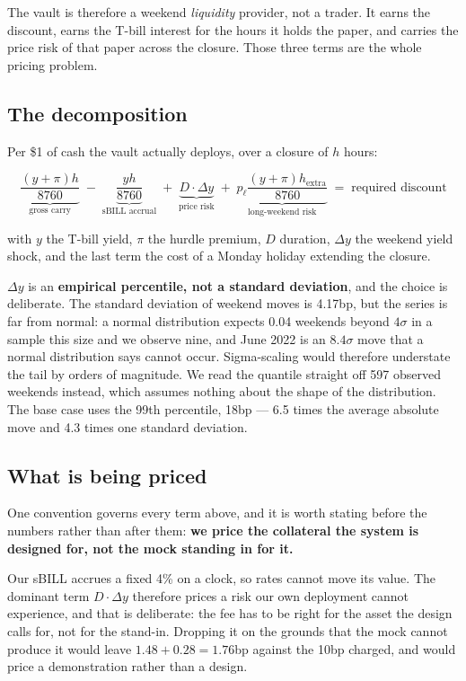 \documentclass[11pt,a4paper]{article}
\begin{document}
The vault is therefore a weekend \emph{liquidity} provider, not a trader. It earns the
discount, earns the T-bill interest for the hours it holds the paper, and carries the
price risk of that paper across the closure. Those three terms are the whole pricing
problem.

\subsection{The decomposition}

Per \$1 of cash the vault actually deploys, over a closure of $h$ hours:

\[
\underbrace{\frac{(y+\pi)h}{8760}}_{\text{gross carry}}
\;-\;\underbrace{\frac{yh}{8760}}_{\text{sBILL accrual}}
\;+\;\underbrace{D\cdot\Delta y}_{\text{price risk}}
\;+\;\underbrace{p_{\ell}\frac{(y+\pi)h_{\text{extra}}}{8760}}_{\text{long-weekend risk}}
\;=\;\text{required discount}
\]

with $y$ the T-bill yield, $\pi$ the hurdle premium, $D$ duration, $\Delta y$ the weekend
yield shock, and the last term the cost of a Monday holiday extending the closure.

$\Delta y$ is an \textbf{empirical percentile, not a standard deviation}, and the choice is
deliberate. The standard deviation of weekend moves is 4.17bp, but the series is far from
normal: a normal distribution expects 0.04 weekends beyond $4\sigma$ in a sample this size
and we observe nine, and June 2022 is an $8.4\sigma$ move that a normal distribution says
cannot occur. Sigma-scaling would therefore understate the tail by orders of magnitude. We
read the quantile straight off 597 observed weekends instead, which assumes nothing about
the shape of the distribution. The base case uses the 99th percentile, 18bp \mbox{---} 6.5 times
the average absolute move and 4.3 times one standard deviation.

\subsection{What is being priced}

One convention governs every term above, and it is worth stating before the numbers
rather than after them: \textbf{we price the collateral the system is designed for, not
the mock standing in for it.}

Our sBILL accrues a fixed 4\% on a clock, so rates cannot move its value. The dominant
term $D\cdot\Delta y$ therefore prices a risk our own deployment cannot experience, and
that is deliberate: the fee has to be right for the asset the design calls for, not for
the stand-in. Dropping it on the grounds that the mock cannot produce it would leave
$1.48+0.28=1.76$bp against the 10bp charged, and would price a demonstration rather than a
design.
\end{document}
